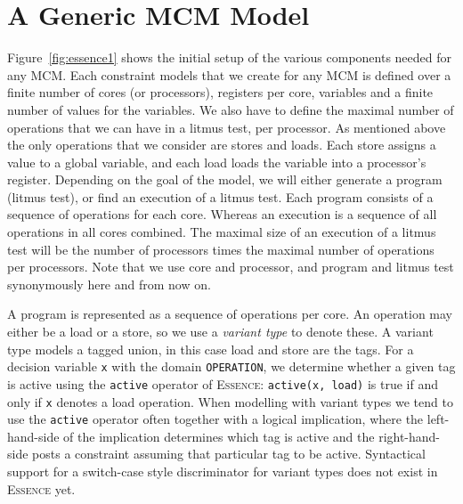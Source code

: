 \documentclass[runningheads]{llncs}
\newcommand{\essence}[0]{\textsc{Essence}}
\begin{document}
\section{A Generic MCM Model}


Figure~\ref{fig:essence1} shows the initial setup of the various components needed for any MCM.
Each constraint models that we create for any MCM is defined over a finite number of cores (or processors), registers per core, variables and a finite number of values for the variables.
We also have to define the maximal number of operations that we can have in a litmus test, per processor.
As mentioned above the only operations that we consider are stores and loads.
Each store assigns a value to a global variable, and each load loads the variable into a processor's register.
Depending on the goal of the model, we will either generate a program (litmus test), or find an execution of a litmus test.
Each program consists of a sequence of operations for each core.
Whereas an execution is a sequence of all operations in all cores combined.
The maximal size of an execution of a litmus test will be the number of processors times the maximal number of operations per processors.
Note that we use core and processor, and program and litmus test synonymously here and from now on.

A program is represented as a sequence of operations per core. An operation may either be a load or a store, so we use a \emph{variant type} to denote these. A variant type models a tagged union, in this case load and store are the tags. For a decision variable \texttt{x} with the domain \texttt{OPERATION}, we determine whether a given tag is active using the \texttt{active} operator of \essence{}: \texttt{active(x, load)} is true if and only if \texttt{x} denotes a load operation. When modelling with variant types we tend to use the \texttt{active} operator often together with a logical implication, where the left-hand-side of the implication determines which tag is active and the right-hand-side posts a constraint assuming that particular tag to be active. Syntactical support for a switch-case style discriminator for variant types does not exist in \essence{} yet.
\end{document}
